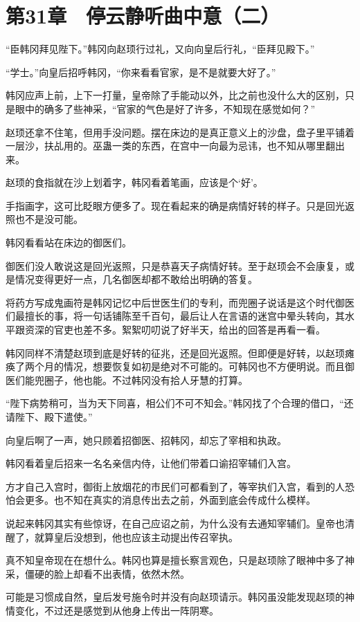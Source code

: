 \section{第31章　停云静听曲中意（二）}

“臣韩冈拜见陛下。”韩冈向赵顼行过礼，又向向皇后行礼，“臣拜见殿下。”

“学士。”向皇后招呼韩冈，“你来看看官家，是不是就要大好了。”

韩冈应声上前，上下一打量，皇帝除了手能动以外，比之前也没什么大的区别，只是眼中的确多了些神采，“官家的气色是好了许多，不知现在感觉如何？”

赵顼还拿不住笔，但用手没问题。摆在床边的是真正意义上的沙盘，盘子里平铺着一层沙，扶乩用的。巫蛊一类的东西，在宫中一向最为忌讳，也不知从哪里翻出来。

赵顼的食指就在沙上划着字，韩冈看着笔画，应该是个‘好’。

手指画字，这可比眨眼方便多了。现在看起来的确是病情好转的样子。只是回光返照也不是没可能。

韩冈看看站在床边的御医们。

御医们没人敢说这是回光返照，只是恭喜天子病情好转。至于赵顼会不会康复，或是情况变得更好一点，几名御医却都不敢给出明确的答复。

将药方写成鬼画符是韩冈记忆中后世医生们的专利，而兜圈子说话是这个时代御医们最擅长的事，将一句话铺陈至千百句，最后让人在言语的迷宫中晕头转向，其水平跟资深的官吏也差不多。絮絮叨叨说了好半天，给出的回答是再看一看。

韩冈同样不清楚赵顼到底是好转的征兆，还是回光返照。但即便是好转，以赵顼瘫痪了两个月的情况，想要恢复如初是绝对不可能的。可韩冈也不方便明说。而且御医们能兜圈子，他也能。不过韩冈没有拾人牙慧的打算。

“陛下病势稍可，当为天下同喜，相公们不可不知会。”韩冈找了个合理的借口，“还请陛下、殿下遣使。”

向皇后啊了一声，她只顾着招御医、招韩冈，却忘了宰相和执政。

韩冈看着皇后招来一名名亲信内侍，让他们带着口谕招宰辅们入宫。

方才自己入宫时，御街上放烟花的市民们可都看到了，等宰执们入宫，看到的人恐怕会更多。也不知在真实的消息传出去之前，外面到底会传成什么模样。

说起来韩冈其实有些惊讶，在自己应诏之前，为什么没有去通知宰辅们。皇帝也清醒了，就算皇后没想到，他也应该主动提出传召宰执。

真不知皇帝现在在想什么。韩冈也算是擅长察言观色，只是赵顼除了眼神中多了神采，僵硬的脸上却看不出表情，依然木然。

可能是习惯成自然，皇后发号施令时并没有向赵顼请示。韩冈虽没能发现赵顼的神情变化，不过还是感觉到从他身上传出一阵阴寒。

